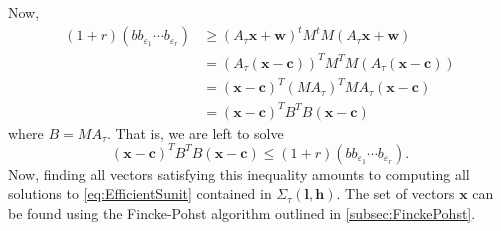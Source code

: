 Now, 
\begin{align*}
(1 + r)(bb_{\varepsilon_1}\cdots b_{\varepsilon_r})
	& \geq (A_\tau \mathbf{x}+\mathbf{w})^tM^tM(A_\tau \mathbf{x}+\mathbf{w}) \\
	& = (A_\tau (\mathbf{x}-\mathbf{c}))^TM^TM(A_\tau (\mathbf{x}-\mathbf{c}))\\
	& = (\mathbf{x}-\mathbf{c})^T(MA_{\tau})^TMA_\tau(\mathbf{x}-\mathbf{c})\\
	& = (\mathbf{x}-\mathbf{c})^TB^TB(\mathbf{x}-\mathbf{c})
\end{align*}
where $B = MA_\tau$. That is, we are left to solve
\[(\mathbf{x}-\mathbf{c})^TB^TB(\mathbf{x}-\mathbf{c}) \leq (1 + r)(bb_{\varepsilon_1}\cdots b_{\varepsilon_r}).\]
Now, finding all vectors satisfying this inequality amounts to computing all solutions to \eqref{eq:EfficientSunit} contained in $\Sigma_{\tau}(\mathbf{l}, \mathbf{h})$. The set of vectors $\mathbf{x}$ can be found using the Fincke-Pohst algorithm outlined in \autoref{subsec:FinckePohst}. 



